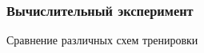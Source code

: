 \documentclass[8pt]{beamer}
\begin{document}
\begin{frame}
	\frametitle{Вычислительный эксперимент}
		\begin{block}{Сравнение различных схем тренировки}
			\begin{figure}[H]
			\end{figure}
		\end{block}

\end{frame}
\end{document}
